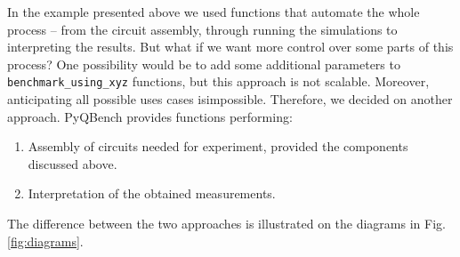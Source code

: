 \documentclass[preprint,12pt, a4paper, dvipsnames]{elsarticle}
\newcommand{\1}{{\rm 1\hspace{-0.9mm}l}}
\theoremstyle{definition}
\begin{document}
In the example presented above we used functions that automate the whole process -- from the circuit assembly, through running the simulations to interpreting the results. But what if we want more control over some parts of this process?
One possibility would be to add some additional parameters to \texttt{benchmark\_using\_xyz}
functions, but this approach is not scalable. Moreover, anticipating all possible uses cases
isimpossible. Therefore, we decided on another approach. PyQBench provides functions performing:
\begin{enumerate}
\item Assembly of circuits needed for experiment, provided the components discussed above.
\item Interpretation of the obtained measurements.
\end{enumerate}
 The difference between the two approaches is illustrated on the diagrams in Fig. \ref{fig:diagrams}.
\end{document}
